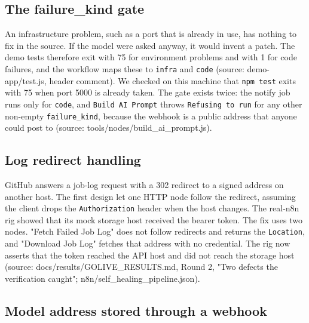 \subsection{The failure\_\allowbreak{}kind gate}

An infrastructure problem, such as a port that is already in use, has nothing to fix in the source. If the model were asked anyway, it would invent a patch. The demo tests therefore exit with 75 for environment problems and with 1 for code failures, and the workflow maps these to \texttt{infra} and \texttt{code} (source: demo-app/\allowbreak{}test.js, header comment). We checked on this machine that \texttt{npm test} exits with 75 when port 5000 is already taken. The gate exists twice: the notify job runs only for \texttt{code}, and \texttt{Build AI Prompt} throws \texttt{Refusing to run} for any other non-empty \texttt{failure\_\allowbreak{}kind}, because the webhook is a public address that anyone could post to (source: tools/\allowbreak{}nodes/\allowbreak{}build\_\allowbreak{}ai\_\allowbreak{}prompt.js).

\subsection{Log redirect handling}

GitHub answers a job-log request with a 302 redirect to a signed address on another host. The first design let one HTTP node follow the redirect, assuming the client drops the \texttt{Authorization} header when the host changes. The real-n8n rig showed that its mock storage host received the bearer token. The fix uses two nodes. "Fetch Failed Job Log" does not follow redirects and returns the \texttt{Location}, and "Download Job Log" fetches that address with no credential. The rig now asserts that the token reached the API host and did not reach the storage host (source: docs/\allowbreak{}results/\allowbreak{}GOLIVE\_\allowbreak{}RESULTS.md, Round 2, "Two defects the verification caught"; n8n/\allowbreak{}self\_\allowbreak{}healing\_\allowbreak{}pipeline.json).

\subsection{Model address stored through a webhook}

